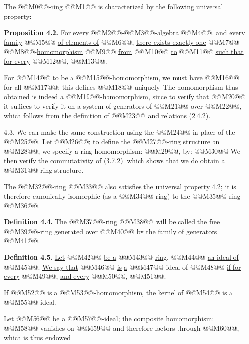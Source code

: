 The @@M0@@-ring @@M1@@ is characterized by the following universal property:

\textbf{Proposition 4.2.} \uline{For every} @@M2@@-@@M3@@-\uline{algebra} @@M4@@, \uline{and every family} @@M5@@ \uline{of elements of} @@M6@@, \uline{there exists exactly one} @@M7@@-@@M8@@-\uline{homomorphism} @@M9@@ \uline{from} @@M10@@ \uline{to} @@M11@@ \uline{such that for every} @@M12@@, @@M13@@.

For @@M14@@ to be a @@M15@@-homomorphism, we must have @@M16@@ for all @@M17@@; this defines @@M18@@ uniquely. The homomorphism thus obtained is indeed a @@M19@@-homomorphism, since to verify that @@M20@@ it suffices to verify it on a system of generators of @@M21@@ over @@M22@@, which follows from the definition of @@M23@@ and relations (2.4.2).

4.3. We can make the same construction using the @@M24@@ in place of the @@M25@@. Let @@M26@@; to define the @@M27@@-ring structure on @@M28@@, we specify a ring homomorphism: @@M29@@, by:
@@M30@@
We then verify the commutativity of (3.7.2), which shows that we do obtain a @@M31@@-ring structure.

The @@M32@@-ring @@M33@@ also satisfies the universal property 4.2; it is therefore canonically isomorphic (as a @@M34@@-ring) to the @@M35@@-ring @@M36@@.

\textbf{Definition 4.4.} \uline{The} @@M37@@-\uline{ring} @@M38@@ \uline{will be called the} free @@M39@@-ring generated over @@M40@@ by the family of generators @@M41@@.

\textbf{Definition 4.5.} \uline{Let} @@M42@@ \uline{be a} @@M43@@-\uline{ring}, @@M44@@ \uline{an ideal of} @@M45@@. \uline{We say that} @@M46@@ \uline{is} \uline{a} @@M47@@-ideal of @@M48@@ \uline{if for every} @@M49@@, \uline{and every} @@M50@@, @@M51@@.

If @@M52@@ is a @@M53@@-homomorphism, the kernel of @@M54@@ is a @@M55@@-ideal.

Let @@M56@@ be a @@M57@@-ideal; the composite homomorphism: @@M58@@ vanishes on @@M59@@ and therefore factors through @@M60@@, which is thus endowed
